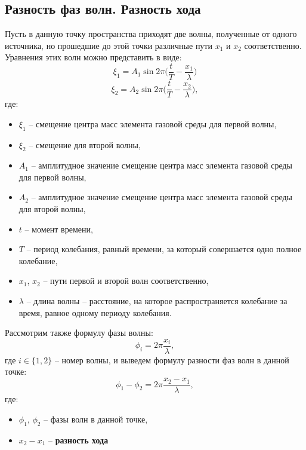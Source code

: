 \documentclass[referat,times]{SCWorks}
\begin{document}
\subsection{Разность фаз волн. Разность хода}
\par Пусть в данную точку пространства приходят две волны, полученные от одного источника, но прошедшие до этой точки различные пути $x_1$ и $x_2$ соответственно. Уравнения этих волн можно представить в виде:
\begin{equation}
    \xi_1 = A_1 \sin{2\pi\bigg(\frac t T - \frac{x_1}{\lambda}\bigg)}
\end{equation}
\begin{equation}
    \xi_2 = A_2 \sin{2\pi\bigg(\frac t T - \frac{x_2}{\lambda}\bigg)},
\end{equation}
где:
\begin{itemize}
    \item $\xi_1$ -- смещение центра масс элемента газовой среды для первой волны,
    \item $\xi_2$ -- смещение для второй волны,
    \item $A_1$ -- амплитудное значение смещение центра масс элемента газовой среды для первой волны,
    \item $A_2$ -- амплитудное значение смещение центра масс элемента газовой среды для второй волны,
    \item $t$ -- момент времени,
    \item $T$ -- период колебания, равный времени, за который совершается одно полное колебание,
    \item $x_1$, $x_2$ -- пути первой и второй волн соответственно,
    \item $\lambda$ -- длина волны -- расстояние, на которое распространяется колебание за время, равное одному периоду колебания.
\end{itemize}
\par Рассмотрим также формулу фазы волны:
\begin{equation}
    \phi_i = 2\pi \frac{x_i}{\lambda},
\end{equation}
где $i \in \{1, 2\}$ -- номер волны, и выведем формулу разности фаз волн в данной точке:
\begin{equation}
    \phi_1 - \phi_2 = 2 \pi \frac{x_2 - x_1}{\lambda},
\end{equation}
где:
\begin{itemize}
    \item $\phi_1$, $\phi_2$ -- фазы волн в данной точке,
    \item $x_2 - x_1$ -- \textbf{разность хода}
\end{itemize}
\end{document}
